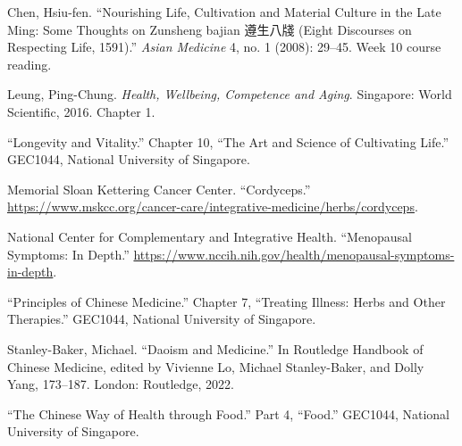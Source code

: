 \documentclass[12pt,a4paper]{article}
\begin{document}
Chen, Hsiu-fen. “Nourishing Life, Cultivation and Material Culture in the Late Ming: Some Thoughts on Zunsheng bajian 遵生八牋 (Eight Discourses on Respecting Life, 1591).” \emph{Asian Medicine} 4, no. 1 (2008): 29--45. Week 10 course reading.

Leung, Ping-Chung. \emph{Health, Wellbeing, Competence and Aging}. Singapore: World Scientific, 2016. Chapter 1.

“Longevity and Vitality.” Chapter 10, “The Art and Science of Cultivating Life.” GEC1044, National University of Singapore.

Memorial Sloan Kettering Cancer Center. “Cordyceps.” \url{https://www.mskcc.org/cancer-care/integrative-medicine/herbs/cordyceps}.

National Center for Complementary and Integrative Health. “Menopausal Symptoms: In Depth.” \url{https://www.nccih.nih.gov/health/menopausal-symptoms-in-depth}.

“Principles of Chinese Medicine.” Chapter 7, “Treating Illness: Herbs and Other Therapies.” GEC1044, National University of Singapore.

Stanley-Baker, Michael. “Daoism and Medicine.” In Routledge Handbook of Chinese Medicine, edited by Vivienne Lo, Michael Stanley-Baker, and Dolly Yang, 173--187. London: Routledge, 2022.

“The Chinese Way of Health through Food.” Part 4, “Food.” GEC1044, National University of Singapore.
\end{document}
